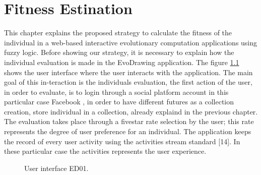 \chapter{Fitness Estination}

This chapter explains the proposed strategy to calculate the fitness of the
individual in a web-based interactive evolutionary computation applications
using fuzzy logic. Before showing our strategy, it is necessary to explain how
the individual evaluation is made in the EvoDrawing application. The figure
\ref{fig:UI_ED} shows the user interface where the user interacts with the
application. The main goal of this in-teraction is the individuals evaluation,
the first action of the user, in order to evaluate, is to login through a social
platform account in this particular case Facebook \cite{facebook}, in order to have
different futures as a collection creation, store individual in a collection,
already explaind in the previous chapter. The evaluation takes place through a
fivestar rate selection by the user; this rate represents the degree of user
preference for an individual. The application keeps the record of every user
activity using the activities stream standard [14]. In these particular case the
activities represents the user experience.

\begin{figure}
\captionsetup{justification=centering,margin=2cm}
\centering
\setlength\fboxsep{0pt}
\setlength\fboxrule{0.7pt}
\caption{User interface ED01.}
\label{fig:UI_ED}
\end{figure}

